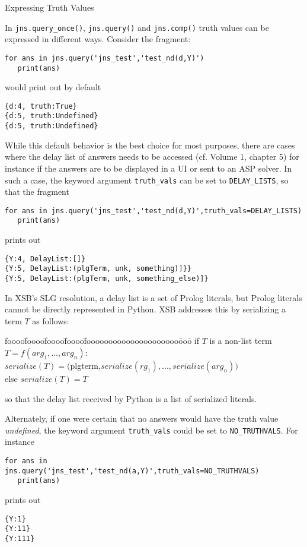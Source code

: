 \begin{example} Expressing Truth Values \rm \label{ex:truth-vals}

  In {\tt jns.query\_once()}, {\tt jns.query()} and {\tt jns.comp()}
  truth values can be expressed in different ways.  Consider the fragment:
\begin{verbatim}
for ans in jns.query('jns_test','test_nd(d,Y)')
   print(ans)
\end{verbatim}
would print out by default
\begin{verbatim}
{d:4, truth:True}
{d:5, truth:Undefined}
{d:5, truth:Undefined}
\end{verbatim}
While this default behavior is the best choice for most purposes,
there are cases where the delay list of answers needs to be accessed
(cf. Volume 1, chapter 5) for instance if the answers are to be
displayed in a UI or sent to an ASP solver.  In such a case, the
keyword argument {\tt truth\_vals} can be set to {\tt DELAY\_LISTS},
so that the fragment
\begin{verbatim}
for ans in jns.query('jns_test','test_nd(d,Y)',truth_vals=DELAY_LISTS) 
   print(ans)
\end{verbatim}
prints out
\begin{verbatim}
{Y:4, DelayList:[]}
{Y:5, DelayList:(plgTerm, unk, something)]}}
{Y:5, DelayList:(plgTerm, unk, something_else)]}
\end{verbatim}
In XSB's SLG resolution, a delay list is a set of Prolog literals, but
Prolog literals cannot be directly represented in Python.  XSB
addresses this by serializing a term $T$ as follows:
{\sf \begin{tabbing}
foooo\=foooo\=foooo\=foooo\=fooooooooooooooooooooo\=ooo\=\kill  
if $T$ is a non-list term $T=f(arg_1,...,arg_n)$: \\
\> $serialize(T) = ($plgterm,$serialize(rg_1),...,serialize(arg_n))$ \\
else $serialize(T) = T$ 
\end{tabbing} }
so that the delay list received by Python is a list of serialized
literals.

Alternately, if one were certain that no answers would have the truth
value {\em undefined}, the keyword argument {\tt truth\_vals} could be
set to {\tt NO\_TRUTHVALS}.  For instance
\begin{verbatim}
for ans in jns.query('jns_test','test_nd(a,Y)',truth_vals=NO_TRUTHVALS) 
   print(ans)
\end{verbatim}
prints out
\begin{verbatim}
{Y:1}
{Y:11}
{Y:111}
\end{verbatim}
\end{example}

